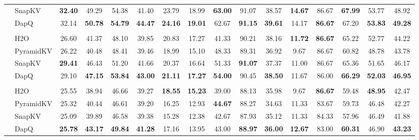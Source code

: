 \begin{table}[t]
{\begin{tabular}{>{\bfseries}c >{\raggedright}p{1.2cm} *{14}{c}}
& SnapKV & \textbf{32.40} & 49.29 & 54.38 & 41.40 & 23.79 & 18.99 & \textbf{63.00} & 91.07 & 38.57 & \textbf{14.67} & 86.67 & \textbf{67.99} & 53.77 & 48.92 \\
& DapQ & 32.14 & \textbf{50.78} & \textbf{54.79} & \textbf{44.47} & \textbf{24.16} & \textbf{19.01} & 62.67 & \textbf{91.15} & \textbf{39.61} & 14.17 & \textbf{86.67} & 67.20 & \textbf{53.83} & \textbf{49.28} \\
& \multicolumn{15}{c}{\cellcolor{gray!20}\textbf{KV Cache Size = 128}} \\
& H2O & 26.60 & 41.37 & 48.10 & 39.85 & 20.83 & 17.27 & 41.33 & 90.21 & 38.16 & \textbf{11.72} & \textbf{86.67} & 65.22 & 52.77 & 44.22 \\
& PyramidKV & 26.22 & 40.48 & 48.41 & 39.46 & 18.99 & 15.10 & 48.33 & 89.31 & 36.92 & 9.67 & 86.67 & 60.82 & 48.78 & 43.78 \\
& SnapKV & \textbf{29.41} & 46.43 & 51.20 & 41.66 & 20.37 & 16.64 & 51.33 & \textbf{91.07} & 37.37 & 11.00 & 86.67 & 65.36 & 51.65 & 46.17 \\
& DapQ & 29.10 & \textbf{47.15} & \textbf{53.84} & \textbf{43.00} & \textbf{21.11} & \textbf{17.27} & \textbf{54.00} & 90.45 & \textbf{38.50} & 11.67 & 86.00 & \textbf{66.29} & \textbf{52.03} & \textbf{46.95} \\
& \multicolumn{15}{c}{\cellcolor{gray!20}\textbf{KV Cache Size = 64}} \\
& H2O & 25.55 & 38.94 & 46.66 & 39.27 & \textbf{18.55} & \textbf{15.23} & 39.00 & 88.13 & 35.98 & 9.67 & \textbf{86.67} & 59.48 & \textbf{48.95} & 42.47 \\
& PyramidKV & 25.32 & 40.44 & 46.61 & 39.20 & 16.25 & 12.93 & \textbf{44.67} & 88.27 & 34.63 & 11.33 & 83.67 & 59.73 & 46.48 & 42.27 \\
& SnapKV & 25.09 & 39.89 & 46.58 & 39.38 & 15.28 & 12.38 & 42.67 & 87.93 & 35.12 & 11.33 & 84.33 & 57.96 & 46.49 & 41.88 \\
& DapQ & \textbf{25.78} & \textbf{43.17} & \textbf{49.84} & \textbf{41.28} & 17.16 & 13.95 & 43.00 & \textbf{88.97} & \textbf{36.00} & \textbf{12.67} & 83.00 & \textbf{60.31} & 46.90 & \textbf{43.23} \\
\bottomrule
\end{tabular}
}
\label{table:longbench_all}
\end{table}

% 
